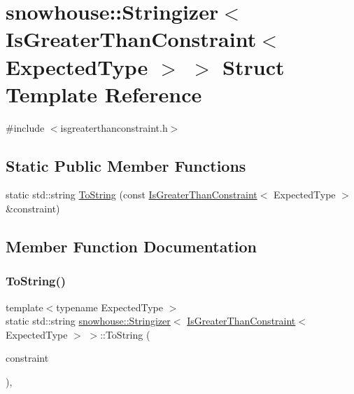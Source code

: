 \hypertarget{structsnowhouse_1_1Stringizer_3_01IsGreaterThanConstraint_3_01ExpectedType_01_4_01_4}{}\section{snowhouse\+::Stringizer$<$ Is\+Greater\+Than\+Constraint$<$ Expected\+Type $>$ $>$ Struct Template Reference}
\label{structsnowhouse_1_1Stringizer_3_01IsGreaterThanConstraint_3_01ExpectedType_01_4_01_4}


{\ttfamily \#include $<$isgreaterthanconstraint.\+h$>$}

\subsection*{Static Public Member Functions}
\begin{DoxyCompactItemize}
\item 
static std\+::string \mbox{\hyperlink{structsnowhouse_1_1Stringizer_3_01IsGreaterThanConstraint_3_01ExpectedType_01_4_01_4_a9c069753074e5b96666e7e3d744c7260}{To\+String}} (const \mbox{\hyperlink{structsnowhouse_1_1IsGreaterThanConstraint}{Is\+Greater\+Than\+Constraint}}$<$ Expected\+Type $>$ \&constraint)
\end{DoxyCompactItemize}


\subsection{Member Function Documentation}
\mbox{\label{structsnowhouse_1_1Stringizer_3_01IsGreaterThanConstraint_3_01ExpectedType_01_4_01_4_a9c069753074e5b96666e7e3d744c7260}} 
\subsubsection{\texorpdfstring{ToString()}{ToString()}}
{\footnotesize\ttfamily template$<$typename Expected\+Type $>$ \\
static std\+::string \mbox{\hyperlink{structsnowhouse_1_1Stringizer}{snowhouse\+::\+Stringizer}}$<$ \mbox{\hyperlink{structsnowhouse_1_1IsGreaterThanConstraint}{Is\+Greater\+Than\+Constraint}}$<$ Expected\+Type $>$ $>$\+::To\+String (\begin{DoxyParamCaption}\item[{const \mbox{\hyperlink{structsnowhouse_1_1IsGreaterThanConstraint}{Is\+Greater\+Than\+Constraint}}$<$ Expected\+Type $>$ \&}]{constraint }\end{DoxyParamCaption})\hspace{0.3cm}{\ttfamily [inline]}, {\ttfamily [static]}}



